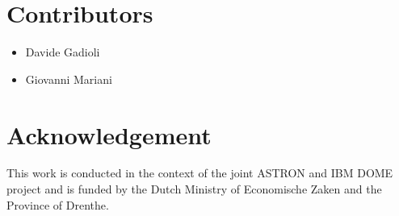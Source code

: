 \documentclass[a4paper, 10pt]{article}
\begin{document}
\section{Contributors}
\begin{itemize}
 \item Davide Gadioli
 \item Giovanni Mariani
\end{itemize}

\section{Acknowledgement}
This work is conducted in the context of the joint
ASTRON and IBM DOME project and is funded by the Dutch Ministry of Economische Zaken and the Province of Drenthe.



\end{document}

